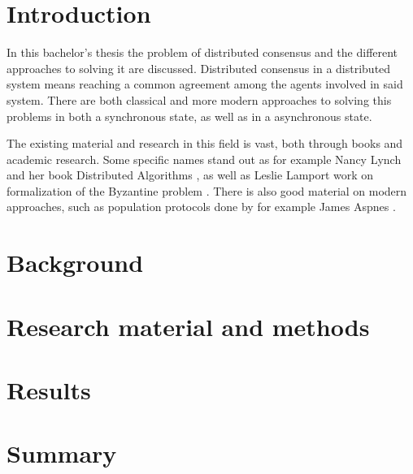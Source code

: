 \documentclass[english, 12pt, a4paper, sci, utf8, a-1b, online]{aaltothesis}
\begin{document}
\section{Introduction}
\thispagestyle{empty}

In this bachelor's thesis the problem of distributed consensus and the different approaches to solving it are discussed. Distributed consensus in a distributed system means reaching a common agreement among the agents involved in said system. There are both classical and more modern approaches to solving this problems in both a synchronous state, as well as in a asynchronous state. 

The existing material and research in this field is vast, both through books and academic research. Some specific names stand out as for example Nancy Lynch and her book Distributed Algorithms \cite{distributed_algorithms}, as well as Leslie Lamport work on formalization of the Byzantine problem \cite{byzantine_generals}. There is also good material on modern approaches, such as population protocols done by for example James Aspnes \cite{simple_populaiton_protocol}.
\clearpage


\clearpage


\section{Background}

\clearpage


\section{Research material and methods}

\clearpage


\section{Results}

\clearpage


\section{Summary} 

\clearpage





\clearpage

\thesisappendix
\end{document}

